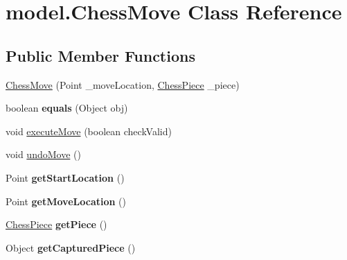 \hypertarget{classmodel_1_1_chess_move}{\section{model.\-Chess\-Move Class Reference}
\label{classmodel_1_1_chess_move}
}
\subsection*{Public Member Functions}
\begin{DoxyCompactItemize}
\item 
\hyperlink{classmodel_1_1_chess_move_afb19b93be0abeee25be72aebe35a6d85}{Chess\-Move} (Point \-\_\-move\-Location, \hyperlink{classmodel_1_1_chess_piece}{Chess\-Piece} \-\_\-piece)
\item 
\hypertarget{classmodel_1_1_chess_move_a8c4f1f2eda79cbf4c904276acf18dc20}{boolean {\bfseries equals} (Object obj)}\label{classmodel_1_1_chess_move_a8c4f1f2eda79cbf4c904276acf18dc20}

\item 
void \hyperlink{classmodel_1_1_chess_move_a284f5700d68e4e8a1d0f89d028a54599}{execute\-Move} (boolean check\-Valid)
\item 
void \hyperlink{classmodel_1_1_chess_move_a15cc98019d1f8b8823b7a4464ca91d5d}{undo\-Move} ()
\item 
\hypertarget{classmodel_1_1_chess_move_ab7763d770448388ba49d6480b6baf7d8}{Point {\bfseries get\-Start\-Location} ()}\label{classmodel_1_1_chess_move_ab7763d770448388ba49d6480b6baf7d8}

\item 
\hypertarget{classmodel_1_1_chess_move_a89ef6d0b7a09792f02af9b6a4f5ef8b4}{Point {\bfseries get\-Move\-Location} ()}\label{classmodel_1_1_chess_move_a89ef6d0b7a09792f02af9b6a4f5ef8b4}

\item 
\hypertarget{classmodel_1_1_chess_move_a5bda891ba042886b6a68182fbd6307f5}{\hyperlink{classmodel_1_1_chess_piece}{Chess\-Piece} {\bfseries get\-Piece} ()}\label{classmodel_1_1_chess_move_a5bda891ba042886b6a68182fbd6307f5}

\item 
\hypertarget{classmodel_1_1_chess_move_ac1c5111a3151395d08bc8a9392acd60d}{Object {\bfseries get\-Captured\-Piece} ()}\label{classmodel_1_1_chess_move_ac1c5111a3151395d08bc8a9392acd60d}

\end{DoxyCompactItemize}



